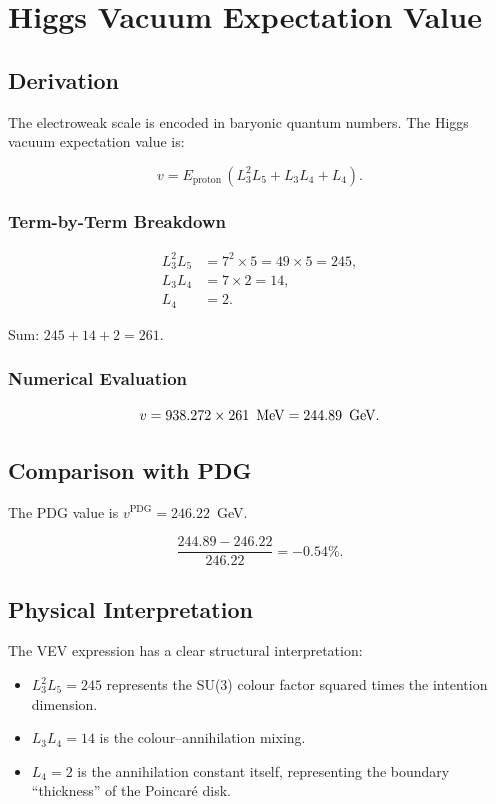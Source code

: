 \chapter{Higgs Vacuum Expectation Value}
\label{ch:higgs_vev}

\section{Derivation}

The electroweak scale is encoded in baryonic quantum numbers.  The Higgs
vacuum expectation value is:

\begin{equation}
v = E_{\text{proton}}\,(L_3^2 L_5 + L_3 L_4 + L_4).
\label{eq:vev}
\end{equation}

\subsection{Term-by-Term Breakdown}

\[
\begin{aligned}
L_3^2 L_5 &= 7^2 \times 5 = 49 \times 5 = 245, \\
L_3 L_4   &= 7 \times 2 = 14, \\
L_4       &= 2.
\end{aligned}
\]

Sum: \(245 + 14 + 2 = 261\).

\subsection{Numerical Evaluation}

\[
v = 938.272 \times 261\ \mev = 244.89\ \gev.
\]

\section{Comparison with PDG}

The PDG value is \(v^{\text{PDG}} = 246.22\)~GeV.

\[
\frac{244.89 - 246.22}{246.22} = -0.54\%.
\]

\section{Physical Interpretation}

The VEV expression has a clear structural interpretation:
\begin{itemize}
\item \(L_3^2 L_5 = 245\) represents the SU(3) colour factor squared times
the intention dimension.
\item \(L_3 L_4 = 14\) is the colour--annihilation mixing.
\item \(L_4 = 2\) is the annihilation constant itself, representing the
boundary ``thickness'' of the Poincar\'{e} disk.
\end{itemize}
